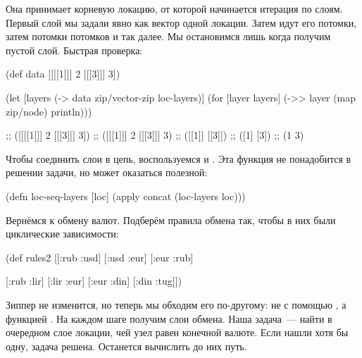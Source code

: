 Она принимает корневую локацию, от которой начинается итерация по слоям. Первый
слой мы задали явно как вектор одной локации. Затем идут его потомки, затем
потомки потомков и так далее. Мы остановимся лишь когда получим пустой
слой. Быстрая проверка:

\begin{english}
  \begin{clojure}
(def data [[[[1]]] 2 [[[3]]] 3])

(let [layers (-> data
                 zip/vector-zip
                 loc-layers)]
  (for [layer layers]
    (->> layer
         (map zip/node)
         println)))

;; ([[[[1]]] 2 [[[3]]] 3])
;; ([[[1]]] 2 [[[3]]] 3)
;; ([[1]] [[3]])
;; ([1] [3])
;; (1 3)
  \end{clojure}
\end{english}

Чтобы соединить слои в цепь, воспользуемся  и . Эта функция не
понадобится в решении задачи, но может оказаться полезной:

\begin{english}
  \begin{clojure}
(defn loc-seq-layers [loc]
  (apply concat (loc-layers loc)))
  \end{clojure}
\end{english}

Вернёмся к обмену валют. Подберём правила обмена так, чтобы в них были
циклические зависимости:

\begin{english}
  \begin{clojure}
(def rules2
  [[:rub :usd]
   [:usd :eur]
   [:eur :rub]

   [:rub :lir]
   [:lir :eur]
   [:eur :din]
   [:din :tug]])
  \end{clojure}
\end{english}

Зиппер не изменится, но теперь мы обходим его по-другому: не с помощью
, а функцией . На каждом шаге получим слои обмена. Наша
задача~--- найти в очередном слое локации, чей узел равен конечной валюте. Если
нашли хотя бы одну, задача решена. Останется вычислить до них путь.

